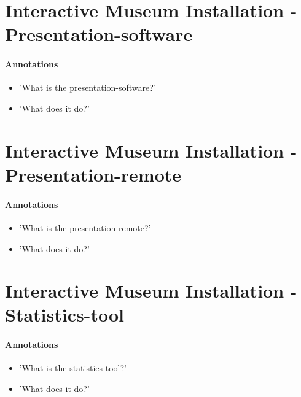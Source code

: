 \section{Interactive Museum Installation - Presentation-software}
\label{implementation_presentation}

\paragraph{Annotations}

\begin{itemize}
	\item 'What is the presentation-software?'
	\item 'What does it do?'
\end{itemize}



\section{Interactive Museum Installation - Presentation-remote}
\label{implementation_remote}

\paragraph{Annotations}

\begin{itemize}
	\item 'What is the presentation-remote?'
	\item 'What does it do?'
\end{itemize}



\section{Interactive Museum Installation - Statistics-tool}
\label{implementation_tool}

\paragraph{Annotations}

\begin{itemize}
	\item 'What is the statistics-tool?'
	\item 'What does it do?'
\end{itemize}
